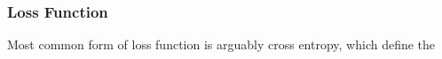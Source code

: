 \subsubsection{Loss Function}

Most common form of loss function is arguably cross entropy, which define the 